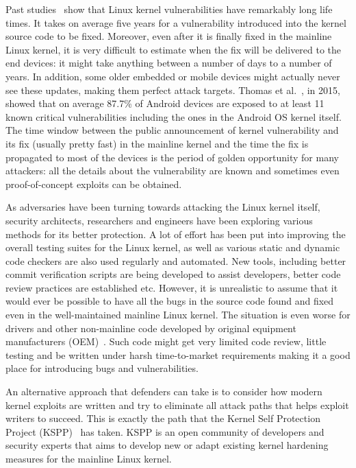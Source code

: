 Past studies~\cite{stoep2016android, cooklss2016} show that Linux kernel vulnerabilities have remarkably long life times. It takes on average five years for a vulnerability introduced into the kernel source code to be fixed. Moreover, even after it is finally fixed in the mainline Linux kernel, it is very difficult to estimate when the fix will be delivered to the end devices: it might take anything between a number of days to a number of years. In addition, some older embedded or mobile devices might actually never see these updates, making them perfect attack targets. Thomas et al.~\cite{Thomas2015}, in 2015, showed that on average 87.7\% of Android devices are exposed to at least 11 known critical vulnerabilities including the ones in the Android OS kernel itself. The time window between the public announcement of kernel vulnerability and its fix (usually pretty fast) in the mainline kernel and the time the fix is propagated to most of the devices is the period of golden opportunity for many attackers: all the details about the vulnerability are known and sometimes even proof-of-concept exploits can be obtained.

As adversaries have been turning towards attacking the Linux kernel itself, security architects, researchers and engineers have been exploring various methods for its better protection. A lot of effort has been put into improving the overall testing suites for the Linux kernel, as well as various static and dynamic code checkers are also used regularly and automated. New tools, including better commit verification scripts are being developed to assist developers, better code review practices are established etc. However, it is unrealistic to assume that it would ever be possible to have all the bugs in the source code found and fixed even in the well-maintained mainline Linux kernel. The situation is even worse for drivers and other non-mainline code developed by original equipment manufacturers (OEM)~\cite{stoep2016android}. Such code might get very limited code review, little testing and be written under harsh time-to-market requirements making it a good place for introducing bugs and vulnerabilities.

An alternative approach that defenders can take is to consider how modern kernel exploits are written and try to eliminate all attack paths that helps exploit writers to succeed. This is exactly the path that the Kernel Self Protection Project (KSPP)~\cite{kspp} has taken. KSPP is an open community of developers and security experts that aims to develop new or adapt existing kernel hardening measures for the mainline Linux kernel. 

